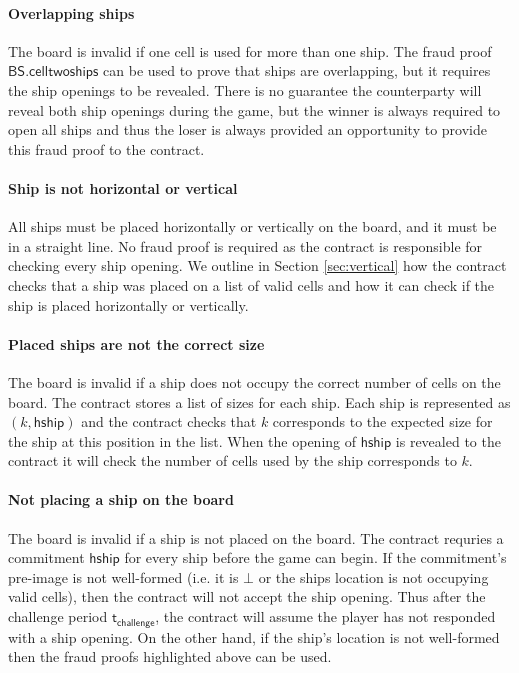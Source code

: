 \documentclass{llncs}
\newcommand{\hship}{\mathsf{hship}}
\newcommand{\battleshiptwoships}{\mathsf{BS.celltwoships}}
\newcommand{\timechallenge}{\mathsf{t}_{\mathsf{challenge}}}
\begin{document}
	\paragraph{Overlapping ships}
	The board is invalid if one cell is used for more than one ship. 
	The fraud proof $\battleshiptwoships$ can be used to prove that ships are overlapping, but it requires the ship openings to be revealed. 
	There is no guarantee the counterparty will reveal both ship openings during the game, but the winner is always required to open all ships and thus the loser is always provided an opportunity to provide this fraud proof to the contract. 
	
	\paragraph{Ship is not horizontal or vertical}
	All ships must be placed horizontally or vertically on the board, and it must be in a straight line. 
	No fraud proof is required as the contract is responsible for checking every ship opening. 
	We outline in Section \ref{sec:vertical} how the contract checks that a ship was placed on a list of valid cells and how it can check if the ship is placed horizontally or vertically. 
	
	\paragraph{Placed ships are not the correct size} 
	The board is invalid if a ship does not occupy the correct number of cells on the board. 
	The contract stores a list of sizes for each ship. 
	Each ship is represented as $(k,\hship)$ and the contract checks that $k$ corresponds to the expected size for the ship at this position in the list. 
	When the opening of $\hship$ is revealed to the contract it will check the number of cells used by the ship corresponds to $k$. 
	
	\paragraph{Not placing a ship on the board} 
	The board is invalid if a ship is not placed on the board. 
	The contract requries a commitment $\hship$ for every ship before the game can begin.
	If the commitment's pre-image is not well-formed (i.e. it is $\bot$ or the ships location is not occupying valid cells), then the contract will not accept the ship opening.
	Thus after the challenge period $\timechallenge$, the contract will assume the player has not responded with a ship opening.
	On the other hand, if the ship's location is not well-formed then the fraud proofs highlighted above can be used. 
	
\end{document}
